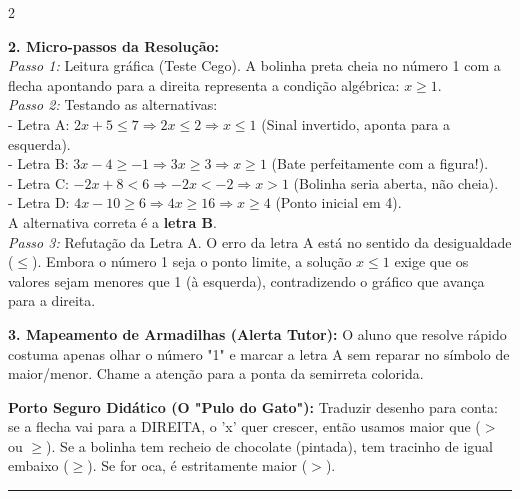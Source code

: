 \begin{multicols*}{2}
\begin{tcolorbox}[colback=CorTitUm!5, colframe=CorTitUm, boxrule=1pt, arc=4pt, left=6pt, right=6pt, top=6pt, bottom=6pt]
    \textbf{2. Micro-passos da Resolução:}\\
    \textit{Passo 1:} Leitura gráfica (Teste Cego). A bolinha preta cheia no número 1 com a flecha apontando para a direita representa a condição algébrica: $x \ge 1$.\\
    \textit{Passo 2:} Testando as alternativas:\\
    - Letra A: $2x + 5 \le 7 \Rightarrow 2x \le 2 \Rightarrow x \le 1$ (Sinal invertido, aponta para a esquerda).\\
    - Letra B: $3x - 4 \ge -1 \Rightarrow 3x \ge 3 \Rightarrow x \ge 1$ (Bate perfeitamente com a figura!).\\
    - Letra C: $-2x + 8 < 6 \Rightarrow -2x < -2 \Rightarrow x > 1$ (Bolinha seria aberta, não cheia).\\
    - Letra D: $4x - 10 \ge 6 \Rightarrow 4x \ge 16 \Rightarrow x \ge 4$ (Ponto inicial em 4).\\
    A alternativa correta é a \textbf{letra B}.\\
    \textit{Passo 3:} Refutação da Letra A. O erro da letra A está no sentido da desigualdade ($\le$). Embora o número 1 seja o ponto limite, a solução $x \le 1$ exige que os valores sejam menores que 1 (à esquerda), contradizendo o gráfico que avança para a direita.\par\vspace{0.1cm}
    
    \textbf{3. Mapeamento de Armadilhas (Alerta Tutor):} O aluno que resolve rápido costuma apenas olhar o número "1" e marcar a letra A sem reparar no símbolo de maior/menor. Chame a atenção para a ponta da semirreta colorida.
    \end{tcolorbox}
    \vspace{0.15cm}
    
    \begin{boxexplicacao}
    \textbf{Porto Seguro Didático (O "Pulo do Gato"):} Traduzir desenho para conta: se a flecha vai para a DIREITA, o 'x' quer crescer, então usamos maior que ($>$ ou $\ge$). Se a bolinha tem recheio de chocolate (pintada), tem tracinho de igual embaixo ($\ge$). Se for oca, é estritamente maior ($>$).
    \end{boxexplicacao}
\fi

\par\vspace{\espacoQuestao}


\noindent\textcolor{CorLinha}{\rule{\linewidth}{0.5pt}} 
\par\vspace{\espacoPreQuestao}

\end{multicols*}
